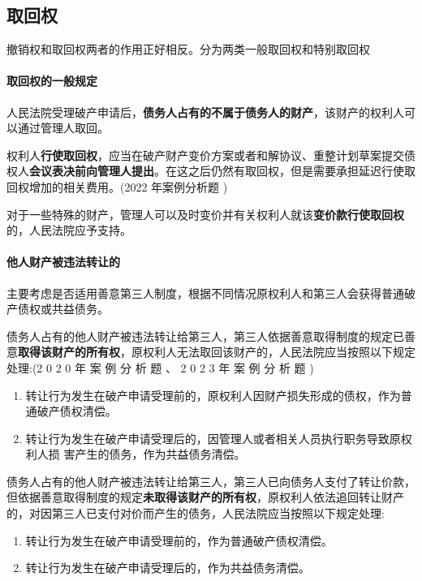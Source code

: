 \documentclass[UTF8,12pt]{ctexart}
\numberwithin{equation}{section} %
\numberwithin{figure}{section}
\numberwithin{table}{section}
\begin{document}
	\subsection{取回权}
	撤销权和取回权两者的作用正好相反。分为两类一般取回权和特别取回权
	\paragraph{取回权的一般规定}
	人民法院受理破产申请后，\textbf{债务人占有的不属于债务人的财产}，该财产的权利人可以通过管理人取回。
	
	权利人\textbf{行使取回权}，应当在破产财产变价方案或者和解协议、重整计划草案提交债权人\textbf{会议表决前向管理人提出}。在这之后仍然有取回权，但是需要承担延迟行使取回权增加的相关费用。(2022 年案例分析题 )
	
	对于一些特殊的财产，管理人可以及时变价并有关权利人就该\textbf{变价款行使取回权}的，人民法院应予支持。
	
	
	\paragraph{他人财产被违法转让的}
	主要考虑是否适用善意第三人制度，根据不同情况原权利人和第三人会获得普通破产债权或共益债务。
	
	债务人占有的他人财产被违法转让给第三人，第三人依据善意取得制度的规定已善意\textbf{取得该财产的所有权}，原权利人无法取回该财产的，人民法院应当按照以下规定处理:(2 0 2 0 年 案 例 分 析 题 、 2 0 2 3 年 案 例 分 析 题 ) 
	\begin{enumerate}
		\item 转让行为发生在破产申请受理前的，原权利人因财产损失形成的债权，作为普通破产债权清偿。
		
		\item 转让行为发生在破产申请受理后的，因管理人或者相关人员执行职务导致原权利人损 害产生的债务，作为共益债务清偿。
	\end{enumerate}
	
	债务人占有的他人财产被违法转让给第三人，第三人已向债务人支付了转让价款，但依据善意取得制度的规定\textbf{未取得该财产的所有权}，原权利人依法追回转让财产的，对因第三人已支付对价而产生的债务，人民法院应当按照以下规定处理:
	\begin{enumerate}
		\item 转让行为发生在破产申请受理前的，作为普通破产债权清偿。
		
		\item 转让行为发生在破产申请受理后的，作为共益债务清偿。
	\end{enumerate}
	
\end{document}
